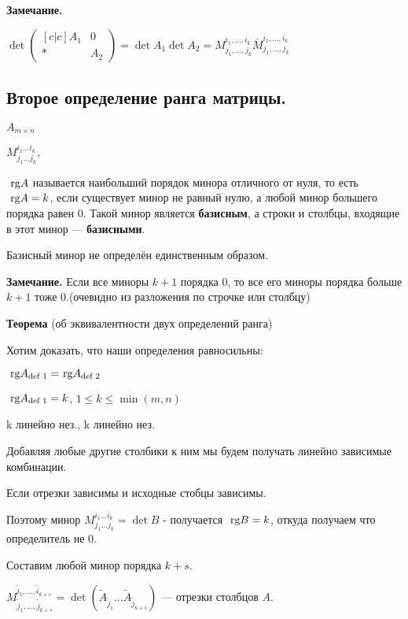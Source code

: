 \textbf{Замечание.}

\(\det \begin{pmatrix}[c|c]
A_1 & 0 \\
\hline 
* & A_2
\end{pmatrix} = \det A_1 \det A_2 = M_{j_1, \ldots, j_k}^{i_1, \ldots, i_k} \overline{M}_{j_1, \ldots, j_k}^{i_1, \ldots, i_k}\)


\subsection{Второе определение ранга матрицы.}

\(A_{m \times n}\)

\(M_{j_1\ldots j_k}^{i_1 \ldots i_k}\), 

\(\rg A\) называется наибольший порядок минора отличного от нуля, то есть \(\rg A = k\), если существует минор не равный нулю, а любой минор большего порядка равен 0. Такой минор является \textbf{базисным}, а строки и столбцы, входящие в этот минор --- \textbf{базисными}.

Базисный минор не определён единственным образом.   

\textbf{Замечание.}  Если все миноры \(k+1\) порядка 0, то все его миноры порядка больше \(k+1\) тоже 0.(очевидно из разложения по строчке или столбцу)

\textbf{Теорема} (об эквивалентности двух определений ранга)

Хотим доказать, что наши определения равносильны:


\( \rg A_{\text{def 1}} = \rg A_{\text{def 2}}\)

\(\rg A_{\text{def 1}} = k\), \(1 \leq k \leq \min(m, n)\)

k линейно нез., k линейно нез.

Добавляя любые другие столбики к ним мы будем получать линейно зависимые комбинации.

Если отрезки зависимы и исходные стобцы зависимы.

Поэтому минор \(M_{j_1\ldots j_k}^{i_1\ldots i_k} = \det B\) - получается \(\rg B = k\), откуда получаем что определитель не 0.

Составим любой минор порядка \(k + s\).

\(M_{\tilde j_1, \ldots, \tilde j_{k + s}}^{\tilde i_1, \ldots, \tilde i_{k + s}} = \det(\tilde A_{\tilde j_1} \ldots \tilde A_{\tilde j_{k + s}})\) --- отрезки столбцов \(A\).

